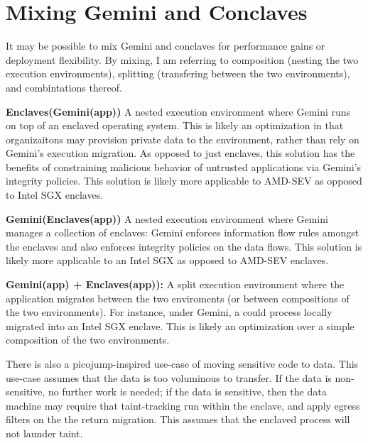 \section{Mixing Gemini and Conclaves}
\label{sec:mixing}

It may be possible to mix Gemini and conclaves for performance gains or
deployment flexibility. 
%
By mixing, I am referring to composition (nesting the two execution
environments), splitting (transfering between the two environments), and
combintations thereof.

\begin{widelist}
\item \textbf{Enclaves(Gemini(app))} 
    A nested execution environment where Gemini runs on top of an enclaved
    operating system.
    This is likely an optimization in that organizaitons may provision private
    data to the environment, rather than rely on Gemini's execution migration.  
    As opposed to just enclaves, this solution has the benefits of constraining
    malicious behavior of untrusted applications via Gemini's integrity
    policies.
    This solution is likely more applicable to AMD-SEV as opposed to Intel SGX
    enclaves.

\item \textbf{Gemini(Enclaves(app))} 
    A nested execution environment where Gemini manages a collection of
    enclaves: Gemini enforces information flow rules amongst the enclaves and
    also enforces integrity policies on the data flows.
    This solution is likely more applicable to an Intel SGX as opposed to
    AMD-SEV enclaves.


\item \textbf{Gemini(app) + Enclaves(app)):}
    A split execution environment where the application migrates between the
    two enviroments (or between compositions of the two environments).
    For instance, under Gemini, a could process locally migrated into an Intel
    SGX enclave.
    This is likely an optimization over a simple composition of the two
    environments.
    

    There is also a picojump-inspired use-case of moving sensitive code to data.
    This use-case assumes that the data is too voluminous to transfer.
    If the data is non-sensitive, no further work is needed; if the data is
    sensitive, then the data machine may require that taint-tracking run within
    the enclave, and apply egress filters on the the return migration.
    This assumes that the enclaved process will not launder taint.
\end{widelist}
